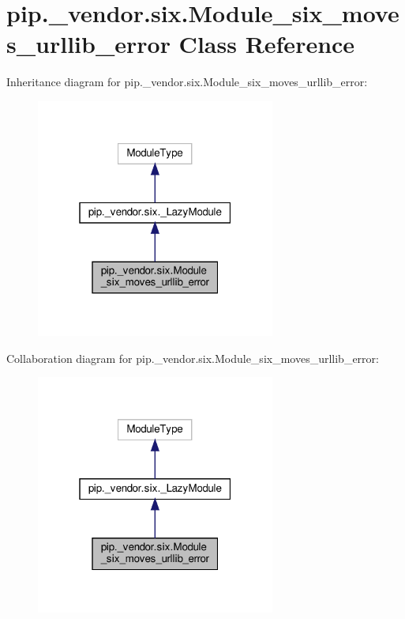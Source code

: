 \hypertarget{classpip_1_1__vendor_1_1six_1_1Module__six__moves__urllib__error}{}\section{pip.\+\_\+vendor.\+six.\+Module\+\_\+six\+\_\+moves\+\_\+urllib\+\_\+error Class Reference}
\label{classpip_1_1__vendor_1_1six_1_1Module__six__moves__urllib__error}


Inheritance diagram for pip.\+\_\+vendor.\+six.\+Module\+\_\+six\+\_\+moves\+\_\+urllib\+\_\+error\+:
\nopagebreak
\begin{figure}[H]
\begin{center}
\leavevmode
\includegraphics[width=223pt]{classpip_1_1__vendor_1_1six_1_1Module__six__moves__urllib__error__inherit__graph}
\end{center}
\end{figure}


Collaboration diagram for pip.\+\_\+vendor.\+six.\+Module\+\_\+six\+\_\+moves\+\_\+urllib\+\_\+error\+:
\nopagebreak
\begin{figure}[H]
\begin{center}
\leavevmode
\includegraphics[width=223pt]{classpip_1_1__vendor_1_1six_1_1Module__six__moves__urllib__error__coll__graph}
\end{center}
\end{figure}
